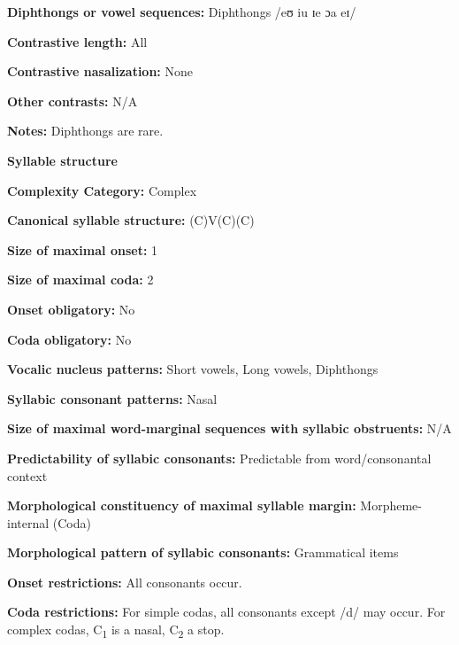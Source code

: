 \textbf{Diphthongs or vowel sequences:} Diphthongs /eʊ iu ɪe ɔa eɪ/



\textbf{Contrastive length:} All



\textbf{Contrastive nasalization:} None



\textbf{Other contrasts:} N/A



\textbf{Notes:} Diphthongs are rare.



\textbf{Syllable structure}



\textbf{Complexity Category:} Complex



\textbf{Canonical syllable structure:} (C)V(C)(C) \citep[6-9]{Sapir1965}



\textbf{Size of maximal onset:} 1



\textbf{Size of maximal coda:} 2



\textbf{Onset obligatory:} No



\textbf{Coda obligatory:} No



\textbf{Vocalic nucleus patterns:} Short vowels, Long vowels, Diphthongs



\textbf{Syllabic consonant patterns:} Nasal



\textbf{Size of maximal word{}-marginal sequences with syllabic obstruents:} N/A



\textbf{Predictability of syllabic consonants:} Predictable from word/consonantal context



\textbf{Morphological constituency of maximal syllable margin:} Morpheme-internal (Coda)



\textbf{Morphological pattern of syllabic consonants:} Grammatical items



\textbf{Onset restrictions:} All consonants occur.



\textbf{Coda restrictions:} For simple codas, all consonants except /d/ may occur. For complex codas, C\textsubscript{1} is a nasal, C\textsubscript{2} a stop.



